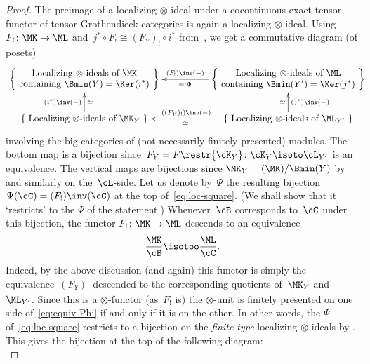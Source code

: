 \documentclass[11pt]{amsart}
\numberwithin{equation}{section} %
\theoremstyle{plain}
\theoremstyle{definition}
\theoremstyle{remark}
\begin{document}
\begin{proof}
The preimage of a localizing $\otimes$-ideal under a cocontinuous exact tensor-functor of tensor Grothendieck categories is again a localizing $\otimes$-ideal. Using~$F_!\colon \MK\to \ML$ and~$j^*\circ F_!\cong (F_Y)_!\circ i^*$ from~, we get a commutative diagram (of posets)
%
\begin{equation}
\label{eq:loc-square}%
\vcenter{
\xymatrix@C=5em@R=2em{
\left\{\ 
\substack{\displaystyle\textrm{Localizing $\otimes$-ideals of~$\MK$}
\\[.1em]
\displaystyle\textrm{containing~$\Bmin(Y)=\Ker(i^*)$}}
\ \right\}
& \left\{\ 
\substack{\displaystyle\textrm{Localizing $\otimes$-ideals of~$\ML$}
\\[.1em]
\displaystyle\textrm{containing~$\Bmin(Y')=\Ker(j^*)$}}
\ \right\}
\ar[l]_-{(F_!)\inv(-)}^-{=:\Psi}
\\
\left\{\ 
\textrm{Localizing $\otimes$-ideals of~}\MK_Y
\ \right\}
\ar[u]_-{\simeq}^-{(i^*)\inv(-)}
\ar@{<-}[r]^{((F_Y)_!)\inv(-)}_-{\simeq}
& 
\left\{\ 
\textrm{Localizing $\otimes$-ideals of~}\ML_{Y'}
\ \right\}
\ar[u]^-{\simeq}_-{(j^*)\inv(-)}
}}\kern-1em
\end{equation}
%
involving the big categories of (not necessarily finitely presented) modules.
The bottom map is a bijection since~$F_Y=F\restr{\cK_Y}\colon \cK_Y\isoto \cL_{Y'}$ is an equivalence. The vertical maps are bijections since $\MK_Y=(\MK)/\Bmin(Y)$ by~ and similarly on the~$\cL$-side.
Let us denote by~$\Psi$ the resulting bijection $\Psi(\cC)=(F_!)\inv(\cC)$ at the top of~\eqref{eq:loc-square}. 
(We shall show that it `restricts' to the $\Psi$ of the statement.)
Whenever~$\cB$ corresponds to~$\cC$ under this bijection, the functor $F_!\colon \MK\to \ML$ descends to an equivalence
%
\begin{equation}
\label{eq:equiv-Phi}%
\frac{\MK}{\cB}\isotoo \frac{\ML}{\cC}.
\end{equation}
%
Indeed, by the above discussion (and  again) this functor is simply the equivalence~$(F_Y)_!$ descended to the corresponding quotients of~$\MK_Y$ and~$\ML_{Y'}$. Since this is a $\otimes$-functor (as~$F_!$ is) the $\otimes$-unit is finitely presented on one side of~\eqref{eq:equiv-Phi} if and only if it is on the other.
In other words, the $\Psi$ of~\eqref{eq:loc-square} restricts to a bijection on the \emph{finite type} localizing $\otimes$-ideals by . This gives the bijection at the top of the following diagram:
%
\begin{equation*}

\end{equation*}
\end{proof}
\end{document}
